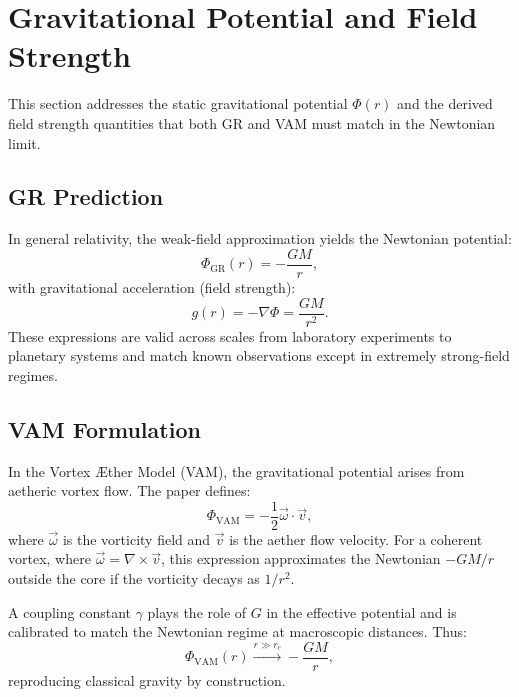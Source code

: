 \section{Gravitational Potential and Field Strength}

This section addresses the static gravitational potential $\Phi(r)$ and the derived field strength quantities that both GR and VAM must match in the Newtonian limit.

\subsection{GR Prediction}
In general relativity, the weak-field approximation yields the Newtonian potential:
\begin{equation}
    \Phi_{\text{GR}}(r) = -\frac{GM}{r},
\end{equation}
with gravitational acceleration (field strength):
\begin{equation}
    g(r) = -\nabla \Phi = \frac{GM}{r^2}.
\end{equation}
These expressions are valid across scales from laboratory experiments to planetary systems and match known observations except in extremely strong-field regimes.

\subsection{VAM Formulation}
In the Vortex \AE{}ther Model (VAM), the gravitational potential arises from aetheric vortex flow. The paper defines:
\begin{equation}
    \Phi_{\text{VAM}} = -\frac{1}{2} \vec{\omega} \cdot \vec{v},
\end{equation}
where $\vec{\omega}$ is the vorticity field and $\vec{v}$ is the aether flow velocity. For a coherent vortex, where $\vec{\omega} = \nabla \times \vec{v}$, this expression approximates the Newtonian $-GM/r$ outside the core if the vorticity decays as $1/r^2$.

A coupling constant $\gamma$ plays the role of $G$ in the effective potential and is calibrated to match the Newtonian regime at macroscopic distances. Thus:
\begin{equation}
    \Phi_{\text{VAM}}(r) \xrightarrow{r \gg r_c} -\frac{GM}{r},
\end{equation}
reproducing classical gravity by construction.


